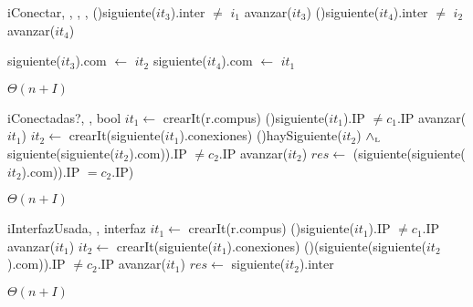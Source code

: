 \begin{Algoritmos}
\begin{algoritmo}{iConectar}{, , , , }{}
   \While(){siguiente($it_{3}$).inter $\neq$ $i_{1}$}{
      avanzar($it_{3}$)
    }
   \While(){siguiente($it_{4}$).inter $\neq$ $i_{2}$}{
      avanzar($it_{4}$)
    }

    siguiente($it_{3}$).com $\gets$ $it_{2}$
    siguiente($it_{4}$).com $\gets$ $it_{1}$
  \end{algoritmo}
 \datosAlgoritmo{} %
  {} %
  {} %
  {$\Theta(n+I)$} %
  {} %
  
  
  \begin{algoritmo}{iConectadas?}{, , }{bool}{}
     $it_{1} \gets$ crearIt(r.compus)
    \While(){siguiente($it_{1}$).IP $\neq c_{1}$.IP}{
      avanzar($it_{1}$)
    }
     $it_{2} \gets$ crearIt(siguiente($it_{1}$).conexiones)
    \While(){haySiguiente($it_{2}$) $\land_{\mathrm{\scriptscriptstyle{L}}}$ siguiente(siguiente($it_{2}$).com)).IP $\neq c_{2}$.IP}{
      avanzar($it_{2}$)
    }
    $res \gets$ (siguiente(siguiente($it_{2}$).com)).IP $= c_{2}$.IP)
  \end{algoritmo}  
 \datosAlgoritmo{} %
  {} %
  {} %
  {$\Theta(n+I)$} %
  {} %

  \begin{algoritmo}{iInterfazUsada}{, , }{interfaz}{}
     $it_{1} \gets$ crearIt(r.compus)  
    \While(){siguiente($it_{1}$).IP $\neq c_{1}$.IP}{
      avanzar($it_{1}$)
    }
     $it_{2} \gets$ crearIt(siguiente($it_{1}$).conexiones)
    \While(){(siguiente(siguiente($it_{2}$).com)).IP $\neq c_{2}$.IP}{
      avanzar($it_{1}$)
    }
    $res \gets$ siguiente($it_{2}$).inter
  \end{algoritmo}  
 \datosAlgoritmo{} %
  {} %
  {} %
  {$\Theta(n+I)$} %
  {} %
    

\end{Algoritmos}

